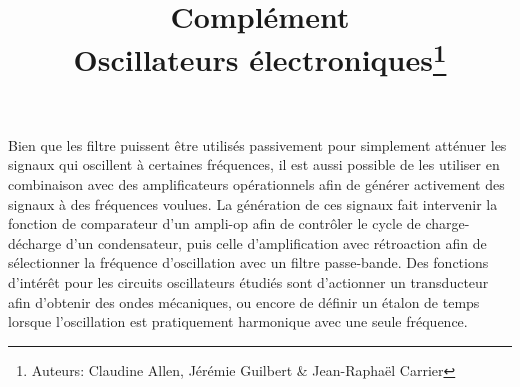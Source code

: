 \documentclass[canadien,12pt,oneside,letterpaper]{article}
\title{\textbf{Complément}\\Oscillateurs électroniques\thanks{Auteurs: Claudine Allen, Jérémie Guilbert \& Jean-Raphaël Carrier}}
\date{}
\begin{document}
\maketitle \vspace{-2cm}


Bien que les filtre puissent être utilisés passivement pour simplement atténuer les signaux qui oscillent à certaines fréquences, il est aussi possible de les utiliser en combinaison avec des amplificateurs opérationnels afin de générer activement des signaux à des fréquences voulues. La génération de ces signaux fait intervenir la fonction de comparateur d'un ampli-op afin de contrôler le cycle de charge-décharge d'un condensateur, puis celle d'amplification avec rétroaction afin de sélectionner la fréquence d'oscillation avec un filtre passe-bande. Des fonctions d’intérêt pour les circuits oscillateurs étudiés sont d’actionner un transducteur afin d’obtenir des ondes mécaniques, ou encore de définir un étalon de temps lorsque l’oscillation est pratiquement harmonique avec une seule fréquence.
\end{document}
